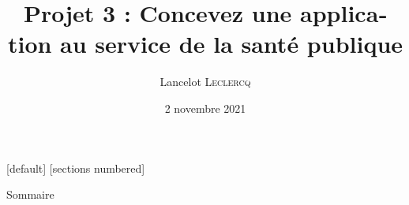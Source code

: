 
\usepackage{fontspec}
	\setmainfont{TeX Gyre Heros}
\usepackage{unicode-math}
\usepackage{lualatex-math}
\usepackage{polyglossia}
\setdefaultlanguage[frenchpart=false]{french}
\usepackage{microtype}
\usepackage[locale = FR,
            separate-uncertainty,
            multi-part-units = single,
            range-units = single]{siunitx}
	\DeclareSIUnit{}
\usepackage{amsmath}
\usepackage{amsfonts}
\usepackage{amssymb}
\usepackage{array}
\usepackage{graphicx}
\graphicspath{{./Figures/}}
\usepackage{booktabs}
\usepackage{tabularx}
\usepackage{multirow}
\usepackage{multicol}
\usepackage{tikz}
\usetikzlibrary{mindmap}
\usetikzlibrary{overlay-beamer-styles}
\usepackage{subcaption}
\usepackage[]{animate}
\usepackage{float}
\usepackage{csquotes}

[default]
[sections numbered]

\title[Concevez une application au service de la santé publique]{Projet 3 : Concevez une application au service de la santé publique}
\author[Lancelot \textsc{Leclercq}]{Lancelot \textsc{Leclercq}} 
\institute[]{}
\date[]{\small{2 novembre 2021}}



\begin{frame}[plain]
  \titlepage
\end{frame}

\begin{frame}{Sommaire}
  \Large 
  \begin{columns}
    \begin{column}{.7\textwidth}
      \tableofcontents[hideallsubsections]
    \end{column}
  \end{columns}
\end{frame}

